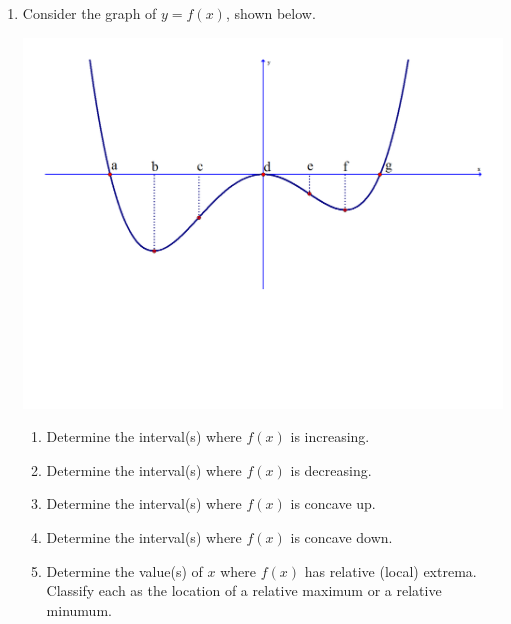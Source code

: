 \documentclass[12pt]{article}
\newif\ifans
\begin{document}
\begin{enumerate}

\item Consider the graph of $y=f(x)$, shown below.

\begin{center}
\includegraphics[scale=0.5]{graph.pdf}
\end{center}

\begin{enumerate}

\item Determine the interval(s) where $f(x)$ is increasing.

\ifans{\fbox{$(b,d) \cup (f,\infty)$}} \fi

\item Determine the interval(s) where $f(x)$ is decreasing.

\ifans{\fbox{$(-\infty,b) \cup (d,f)$}} \fi

\item Determine the interval(s) where $f(x)$ is concave up.

\ifans{\fbox{$(-\infty,c) \cup (e,\infty)$}} \fi

\item Determine the interval(s) where $f(x)$ is concave down.

\ifans{\fbox{$(c,e)$}} \fi

\item Determine the value(s) of $x$ where $f(x)$ has relative (local) extrema.  Classify each as the location of a relative maximum or a relative minumum.


\end{enumerate}
\end{enumerate}
\end{document}
